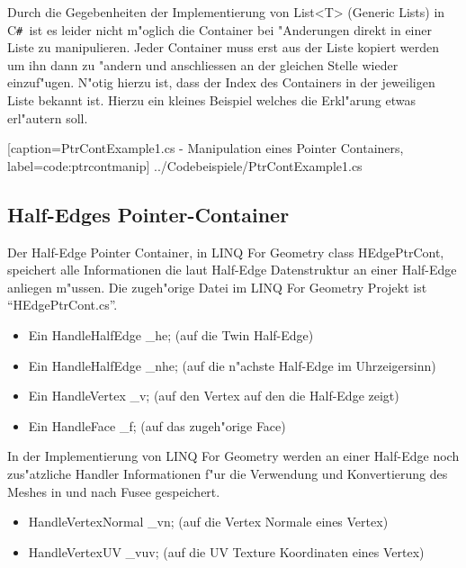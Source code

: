 \documentclass[pagesize, paper=a4, fontsize=12pt,titlepage=true, headings=small, headnosepline, abstractoff, liststotoc, nochapterprefix, plainheadsepline]{scrreprt}
\newcommand{\CSS}{C\texttt{\# }}
\newcommand{\LFGS}{LINQ For Geometry }
\newcommand{\HES}{Half-Edge Datenstruktur }
\begin{document}
Durch die Gegebenheiten der Implementierung von List<T> (Generic Lists) in \CSS ist es leider nicht m"oglich die Container bei "Anderungen direkt in einer Liste zu manipulieren. Jeder Container muss erst aus der Liste kopiert werden um ihn dann zu "andern und anschliessen an der gleichen Stelle wieder einzuf"ugen. N"otig hierzu ist, dass der Index des Containers in der jeweiligen Liste bekannt ist. Hierzu ein kleines Beispiel welches die Erkl"arung etwas erl"autern soll.

			[caption={PtrContExample1.cs - Manipulation eines Pointer Containers}, label=code:ptrcontmanip]
			{../Codebeispiele/PtrContExample1.cs}
\newpage
\subsection {Half-Edges Pointer-Container}
			Der Half-Edge Pointer Container, in \LFGS class HEdgePtrCont, speichert alle Informationen die laut \HES an einer Half-Edge anliegen m"ussen. Die zugeh"orige Datei im \LFGS Projekt ist "`HEdgePtrCont.cs"'.
\begin{itemize}
\item Ein HandleHalfEdge \_he; (auf die Twin Half-Edge)
\item Ein HandleHalfEdge \_nhe; (auf die n"achste Half-Edge im Uhrzeigersinn)
\item Ein HandleVertex \_v; (auf den Vertex auf den die Half-Edge zeigt)
\item Ein HandleFace \_f; (auf das zugeh"orige Face)
\end{itemize}

In der Implementierung von \LFGS werden an einer Half-Edge noch zus"atzliche Handler Informationen f"ur die Verwendung und Konvertierung des Meshes in und nach Fusee gespeichert.

\begin{itemize}
\item HandleVertexNormal \_vn; (auf die Vertex Normale eines Vertex)
\item HandleVertexUV \_vuv; (auf die UV Texture Koordinaten eines Vertex)
\end{itemize}
\end{document}
